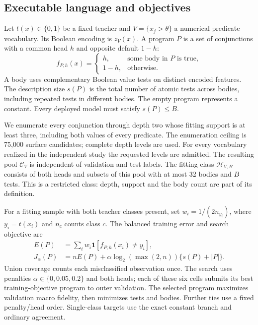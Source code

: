 \documentclass[review,12pt]{elsarticle}
\begin{document}
\subsection{Executable language and objectives}
Let $t(x)\in\{0,1\}$ be a fixed teacher and $V=\{x_j>\theta\}$ a numerical predicate vocabulary. Its Boolean encoding is $z_V(x)$. A program $P$ is a set of conjunctions with a common head $h$ and opposite default $1-h$:
\begin{equation}
 f_{P,h}(x)=\begin{cases}h,&\text{some body in }P\text{ is true},\\1-h,&\text{otherwise}.\end{cases}
\end{equation}
A body uses complementary Boolean value tests on distinct encoded features. The description size $s(P)$ is the total number of atomic tests across bodies, including repeated tests in different bodies. The empty program represents a constant. Every deployed model must satisfy $s(P)\leq B$.

We enumerate every conjunction through depth two whose fitting support is at least three, including both values of every predicate. The enumeration ceiling is 75,000 surface candidates; complete depth levels are used. For every vocabulary realized in the independent study the requested levels are admitted. The resulting pool $\mathcal C_V$ is independent of validation and test labels. The fitting class $\mathcal H_{V,B}$ consists of both heads and subsets of this pool with at most 32 bodies and $B$ tests. This is a restricted class: depth, support and the body count are part of its definition.

For a fitting sample with both teacher classes present, set $w_i=1/(2n_{y_i})$, where $y_i=t(x_i)$ and $n_c$ counts class $c$. The balanced training error and search objective are
\begin{align}
 E(P)&=\sum_i w_i\mathbf1[f_{P,h}(x_i)\ne y_i],\\
 J_\alpha(P)&=nE(P)+\alpha\log_2(\max(2,n))\{s(P)+|P|\}.\label{eq:objective}
\end{align}
Union coverage counts each misclassified observation once. The search uses penalties $\alpha\in\{0,0.05,0.2\}$ and both heads; each of these six cells submits its best training-objective program to outer validation. The selected program maximizes validation macro fidelity, then minimizes tests and bodies. Further ties use a fixed penalty/head order. Single-class targets use the exact constant branch and ordinary agreement.
\end{document}
